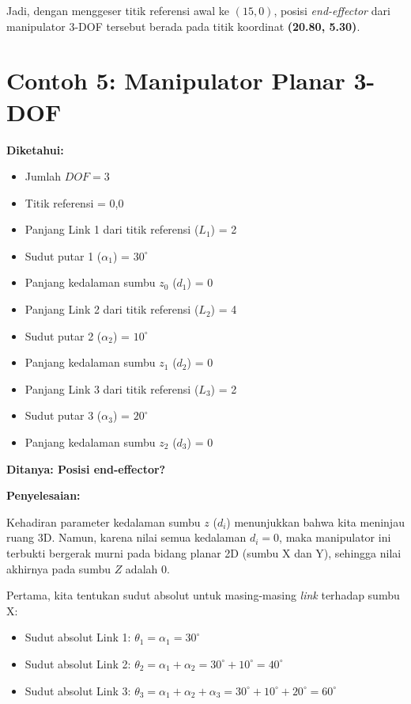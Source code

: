 \documentclass[12pt, a4paper, bahasa]{article}
\begin{document}
Jadi, dengan menggeser titik referensi awal ke $(15,0)$, posisi \textit{end-effector} dari manipulator 3-DOF tersebut berada pada titik koordinat \textbf{(20.80, 5.30)}.

\section*{Contoh 5: Manipulator Planar 3-DOF}
\textbf{Diketahui:}
\begin{itemize}
    \item Jumlah $DOF = 3$
    \item Titik referensi = 0,0
    \item Panjang Link 1 dari titik referensi ($L_1$) = 2
    \item Sudut putar 1 ($\alpha_1$) = $30^\circ$
    \item Panjang kedalaman sumbu $z_0$ ($d_1$) = 0
    \item Panjang Link 2 dari titik referensi ($L_2$) = 4
    \item Sudut putar 2 ($\alpha_2$) = $10^\circ$
    \item Panjang kedalaman sumbu $z_1$ ($d_2$) = 0
    \item Panjang Link 3 dari titik referensi ($L_3$) = 2
    \item Sudut putar 3 ($\alpha_3$) = $20^\circ$
    \item Panjang kedalaman sumbu $z_2$ ($d_3$) = 0
\end{itemize}

\noindent \textbf{Ditanya: Posisi end-effector?}
\vspace{0.5cm}

\noindent \textbf{Penyelesaian:}

Kehadiran parameter kedalaman sumbu $z$ ($d_i$) menunjukkan bahwa kita meninjau ruang 3D. Namun, karena nilai semua kedalaman $d_i = 0$, maka manipulator ini terbukti bergerak murni pada bidang planar 2D (sumbu X dan Y), sehingga nilai akhirnya pada sumbu $Z$ adalah $0$.

Pertama, kita tentukan sudut absolut untuk masing-masing \textit{link} terhadap sumbu X:
\begin{itemize}
    \item Sudut absolut Link 1: $\theta_1 = \alpha_1 = 30^\circ$
    \item Sudut absolut Link 2: $\theta_2 = \alpha_1 + \alpha_2 = 30^\circ + 10^\circ = 40^\circ$
    \item Sudut absolut Link 3: $\theta_3 = \alpha_1 + \alpha_2 + \alpha_3 = 30^\circ + 10^\circ + 20^\circ = 60^\circ$
\end{itemize}
\end{document}
